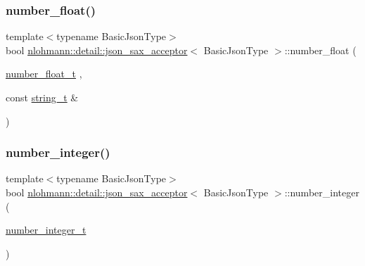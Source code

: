\subsubsection{\texorpdfstring{number\+\_\+float()}{number\_float()}}
{\footnotesize\ttfamily template$<$typename Basic\+Json\+Type$>$ \\
bool \hyperlink{classnlohmann_1_1detail_1_1json__sax__acceptor}{nlohmann\+::detail\+::json\+\_\+sax\+\_\+acceptor}$<$ Basic\+Json\+Type $>$\+::number\+\_\+float (\begin{DoxyParamCaption}\item[{\hyperlink{classnlohmann_1_1detail_1_1json__sax__acceptor_a5502f483fc60a1bcd73e0e46b6ab36e4}{number\+\_\+float\+\_\+t}}]{,  }\item[{const \hyperlink{classnlohmann_1_1detail_1_1json__sax__acceptor_a3a8078bbf865ec355106f6048241609a}{string\+\_\+t} \&}]{ }\end{DoxyParamCaption})\hspace{0.3cm}{\ttfamily [inline]}}

\mbox{\label{classnlohmann_1_1detail_1_1json__sax__acceptor_a976bf4ce6e9a2ffe48f683ddff80af00}} 
\subsubsection{\texorpdfstring{number\+\_\+integer()}{number\_integer()}}
{\footnotesize\ttfamily template$<$typename Basic\+Json\+Type$>$ \\
bool \hyperlink{classnlohmann_1_1detail_1_1json__sax__acceptor}{nlohmann\+::detail\+::json\+\_\+sax\+\_\+acceptor}$<$ Basic\+Json\+Type $>$\+::number\+\_\+integer (\begin{DoxyParamCaption}\item[{\hyperlink{classnlohmann_1_1detail_1_1json__sax__acceptor_a41876b17c0e8bdb55580eaf5e4e2ded8}{number\+\_\+integer\+\_\+t}}]{ }\end{DoxyParamCaption})\hspace{0.3cm}{\ttfamily [inline]}}

\mbox{\label{classnlohmann_1_1detail_1_1json__sax__acceptor_ad15b288f3351287edbe289502f595491}} 
